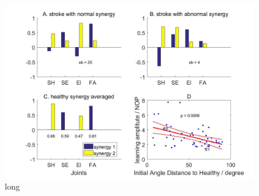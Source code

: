 \begin{figure}
	\centering
	\includegraphics[width=1\linewidth]{figures/6synergy}
	\caption[short]{long}
	\label{fig:6synergy}
\end{figure}

